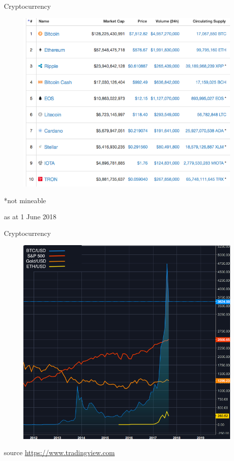 \documentclass[10pt]{beamer}
\begin{document}

\begin{frame}{Cryptocurrency}
	\begin{figure}[]
		\centering
		\includegraphics  [scale=0.3]{Images/markcap}
	\end{figure}
	*not mineable\\
	\begin{tiny}
		as at 1 June 2018
	\end{tiny}
\end{frame}



\begin{frame}{Cryptocurrency}
	\begin{figure}[]
		\centering
		\includegraphics  [width=3.in]{Images/price}
	\end{figure}
	\begin{scriptsize}
		source \href{https://www.tradingview.com}{https://www.tradingview.com}
	\end{scriptsize}
\end{frame}
\end{document}
